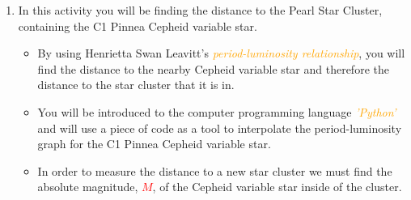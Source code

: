 \documentclass{article}
\begin{document}
    \begin{enumerate}[label=\color{dblue}\theenumi]
        \item In this activity you will be finding the distance to the Pearl Star Cluster, containing the C1 Pinnea Cepheid variable star.
        \begin{itemize}
            \item By using Henrietta Swan Leavitt's \emph{\textcolor{orange}{period-luminosity relationship}}, you will find the distance to the nearby Cepheid variable star and therefore the distance to the star cluster that it is in.
            \item You will be introduced to the computer programming language \emph{\textcolor{orange}{'Python'}} and will use a piece of code as a tool to interpolate the period-luminosity graph for the C1 Pinnea Cepheid variable star.
            \item In order to measure the distance to a new star cluster we must find the absolute magnitude, \textbf{\textcolor{red}{\(M\)}}, of the Cepheid variable star inside of the cluster.\\
        \end{itemize}
    \end{enumerate}
\end{document}

